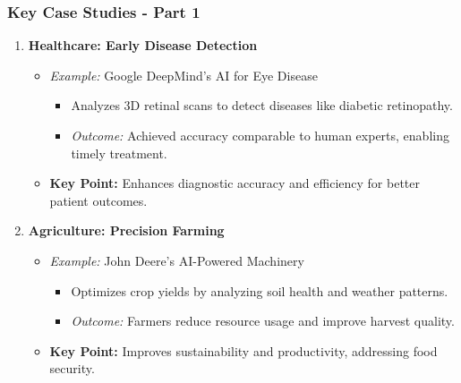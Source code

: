\documentclass{beamer}
\begin{document}
\begin{frame}[fragile]
    \frametitle{Key Case Studies - Part 1}
    \begin{enumerate}
        \item \textbf{Healthcare: Early Disease Detection}
        \begin{itemize}
            \item \textit{Example:} Google DeepMind's AI for Eye Disease
            \begin{itemize}
                \item Analyzes 3D retinal scans to detect diseases like diabetic retinopathy.
                \item \textit{Outcome:} Achieved accuracy comparable to human experts, enabling timely treatment.
            \end{itemize}
            \item \textbf{Key Point:} Enhances diagnostic accuracy and efficiency for better patient outcomes.
        \end{itemize}

        \item \textbf{Agriculture: Precision Farming}
        \begin{itemize}
            \item \textit{Example:} John Deere’s AI-Powered Machinery
            \begin{itemize}
                \item Optimizes crop yields by analyzing soil health and weather patterns.
                \item \textit{Outcome:} Farmers reduce resource usage and improve harvest quality.
            \end{itemize}
            \item \textbf{Key Point:} Improves sustainability and productivity, addressing food security.
        \end{itemize}
    \end{enumerate}
\end{frame}
\end{document}
